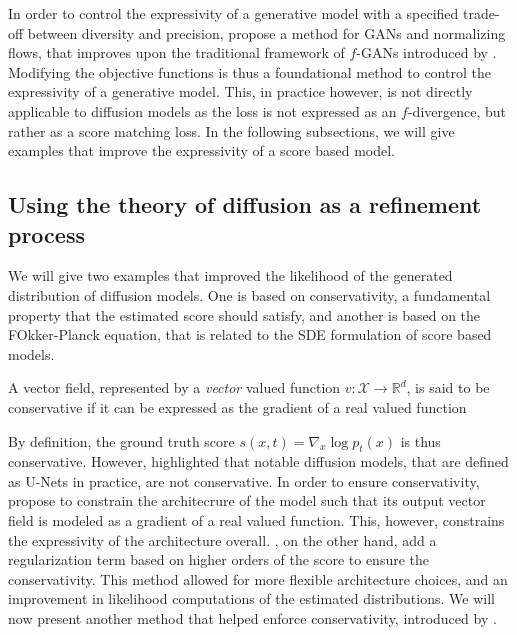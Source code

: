 In order to control the expressivity of a generative model with a specified trade-off between diversity and precision, \citep{verine2024precision} propose a method for GANs and normalizing flows, that improves upon the traditional framework of $f$-GANs introduced by \citep{nowozin2016fgantraininggenerativeneural}.
Modifying the objective functions is thus a foundational method to control the expressivity of a generative model. This, in practice however, is not directly applicable to diffusion models as the loss is not expressed as an $f$-divergence, but rather as a score matching loss. In the following subsections, we will give examples that improve the expressivity of a score based model.


\subsection{Using the theory of diffusion as a refinement process}
We will give two examples that improved the likelihood of the generated distribution of diffusion models. One is based on conservativity, a fundamental property that the estimated score should satisfy, and another is based on the FOkker-Planck equation, that is related to the SDE formulation of score based models.
\begin{definition}
    A vector field, represented by a \textit{vector} valued function $v : \mathcal{X} \rightarrow \mathbb{R}^{d}$, is said to be conservative if it can be expressed as the gradient of a real valued function
\end{definition}
By definition, the ground truth score $s(x,t) = \nabla_{x} \log p_{t}(x)$ is thus conservative. However, \citep{salimans2021should,chao2023investigatingconservativepropertyscorebased} highlighted that notable diffusion models, that are defined as U-Nets in practice, are not conservative. In order to ensure conservativity, \citep{salimans2021should,saremi2018deepenergyestimatornetworks} propose to constrain the architecrure of the model such that its output vector field is modeled as a gradient of a real valued function. This, however, constrains the expressivity of the architecture overall. \citep{chao2023investigatingconservativepropertyscorebased}, on the other hand, add a regularization term based on higher orders of the score to ensure the conservativity. This method allowed for more flexible architecture choices, and an improvement in likelihood computations of the estimated distributions. We will now present another method that helped enforce conservativity, introduced by \citep{lai_fp-diffusion_2023}.
